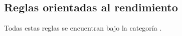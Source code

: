 \subsection{Reglas orientadas al rendimiento}

Todas estas reglas se encuentran bajo la categoría .
